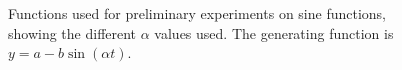 \documentclass[a4paper,11pt]{article}
\begin{document}
  \begin{figure}
  \\
  \\
  \begin{center}
  \end{center}
  \caption{Functions used for preliminary experiments on sine functions, showing
  the different $\alpha$ values used. The generating function is $y=a-b\sin(\alpha t)$.}
  \label{fig:avals}
  \end{figure}
\end{document}
